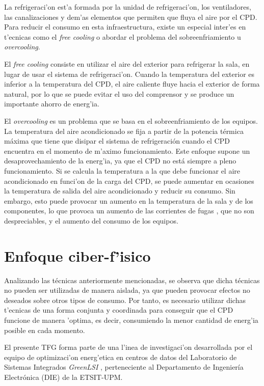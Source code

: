 	La refrigeraci'on est'a formada por la unidad de refrigeraci'on, los ventiladores, las canalizaciones y dem'as elementos que permiten que fluya el aire por el CPD. Para reducir el consumo en esta infraestructura, existe un especial inter'es en t'ecnicas como el \textit{free cooling} o abordar el problema del sobreenfriamiento u \textit{overcooling}.

	 El \textit{free cooling} \cite{FreeCooling} consiste en utilizar el aire del exterior para refrigerar la sala, en lugar de usar el sistema de refrigeraci'on. Cuando la temperatura del exterior es inferior a la temperatura del CPD, el aire caliente fluye hacia el exterior de forma natural, por lo que se puede evitar el uso del comprensor y se produce un  importante ahorro de energ'ia.

	El \textit{overcooling} \cite{OverCooling} es un problema que se basa en el sobreenfriamiento de los equipos. La temperatura del aire acondicionado se fija a partir de la potencia térmica máxima que tiene que disipar el sistema de refrigeración cuando el CPD encuentra en el momento de m'aximo funcionamiento. Este enfoque supone un desaprovechamiento de la energ'ia, ya que el CPD no está siempre a pleno funcionamiento. Si se calcula la temperatura a la que debe funcionar el aire acondicionado en funci'on de la carga del CPD, se puede aumentar en ocasiones la temperatura de salida del aire acondicionado y reducir su consumo. Sin embargo, esto puede provocar un aumento en la temperatura de la sala y de los componentes, lo que provoca un aumento de las corrientes de fugas \cite{cfugas}, que no son despreciables, y el aumento del consumo de los equipos.

\section{ Enfoque ciber-f'isico}\label{sec:enfoque}

	Analizando las técnicas anteriormente mencionadas, se observa que dicha técnicas no pueden ser utilizadas de manera aislada, ya que pueden provocar efectos no deseados sobre otros tipos de consumo. Por tanto, es necesario utilizar dichas t'ecnicas de una forma conjunta y coordinada para conseguir que el CPD funcione de manera 'optima, es decir, consumiendo la menor cantidad de energ'ia posible en cada momento.

	El presente TFG forma parte de una l'inea de investigaci'on desarrollada por el equipo de optimizaci'on energ'etica en centros de datos del Laboratorio de Sistemas Integrados \textit{GreenLSI} \cite{GreenLSI}, perteneciente al Departamento de Ingeniería Electrónica (DIE) de la ETSIT-UPM. 

